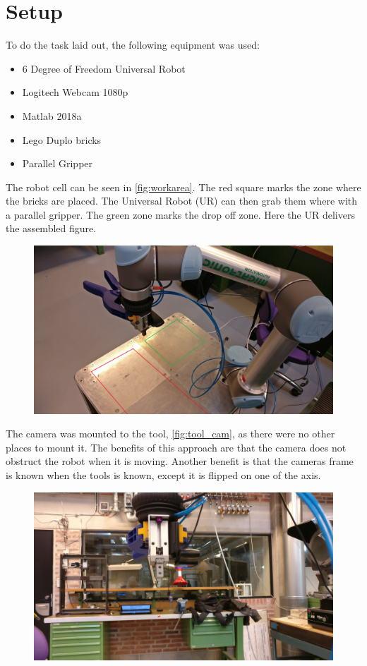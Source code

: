\chapter{Setup}
To do the task laid out, the following equipment was used:

\begin{itemize}
\item 6 Degree of Freedom Universal Robot
\item Logitech Webcam 1080p
\item Matlab 2018a
\item Lego Duplo bricks
\item Parallel Gripper
\end{itemize}

The robot cell can be seen in \autoref{fig:workarea}. The red square marks the zone where the bricks are placed. The Universal Robot (UR) can then grab them where with a parallel gripper. The green zone marks the drop off zone. Here the UR delivers the assembled figure.

\begin{figure}[h]
\centering
\includegraphics[width=\textwidth]{figures/workarea.jpg}
\caption{}
\label{fig:workarea}
\end{figure}

The camera was mounted to the tool, \autoref{fig:tool_cam}, as there were no other places to mount it. The benefits of this approach are that the camera does not obstruct the robot when it is moving. Another benefit is that the cameras frame is known when the tools is known, except it is flipped on one of the axis.

\begin{figure}[h]
\centering
\includegraphics[width=\textwidth]{figures/tool_cam.jpg}
\caption{}
\label{fig:tool_cam}
\end{figure}